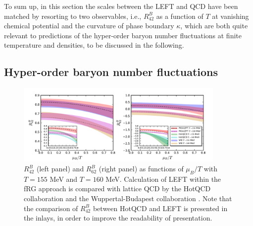 \documentclass[%
reprint,
superscriptaddress,
showpacs,preprintnumbers,
 amsmath,amssymb,
 aps,
prd,
]{revtex4-1}
\begin{document}
To sum up, in this section the scales between the LEFT and QCD have been matched by resorting to two observables, i.e., $R^{B}_{42}$ as a function of $T$ at vanishing chemical potential and the curvature of phase boundary $\kappa$, which are both quite relevant to predictions of the hyper-order baryon number fluctuations at finite temperature and densities, to be discussed in the following. 


\subsection{Hyper-order baryon number fluctuations}
\label{subsec:hyper-order}

%
%

%
\begin{figure}[t]
\includegraphics[width=0.9\textwidth]{R42R62-muBoT}
\caption{$R^{B}_{42}$ (left panel) and $R^{B}_{62}$ (right panel) as functions of $\mu_B/T$ with $T=155$ MeV and $T=160$ MeV. Calculation of LEFT within the fRG approach is compared with lattice QCD by the HotQCD collaboration \cite{Bazavov:2020bjn} and the Wuppertal-Budapest collaboration \cite{Borsanyi:2018grb}. Note that the comparison of $R^{B}_{42}$ between HotQCD and LEFT is presented in the inlays, in order to improve the readability of presentation.}\label{fig:R42R62-muBoT}
\end{figure}
%
\end{document}
